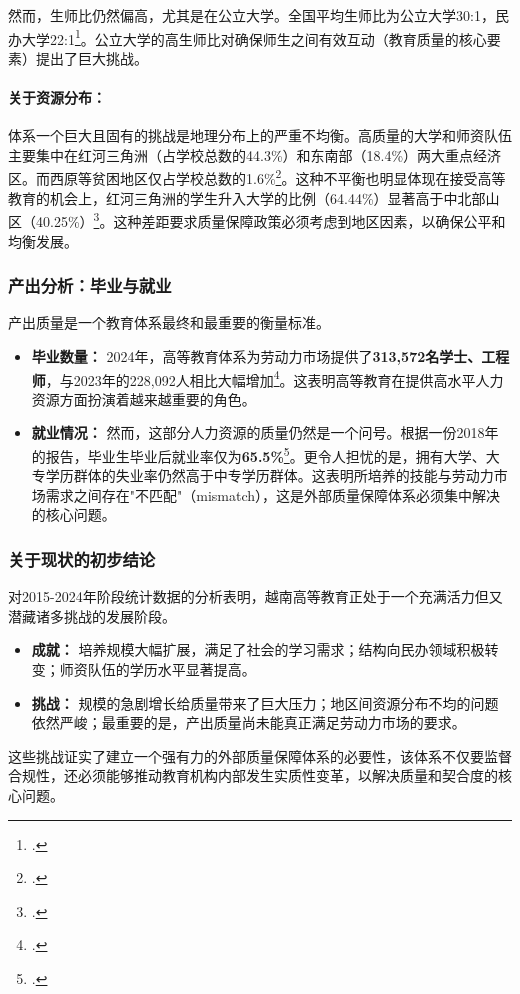 然而，生师比仍然偏高，尤其是在公立大学。全国平均生师比为公立大学30:1，民办大学22:1\footcite{stat_moet_2024}。公立大学的高生师比对确保师生之间有效互动（教育质量的核心要素）提出了巨大挑战。

\paragraph{关于资源分布：}
体系一个巨大且固有的挑战是地理分布上的严重不均衡。高质量的大学和师资队伍主要集中在红河三角洲（占学校总数的44.3\%）和东南部（18.4\%）两大重点经济区。而西原等贫困地区仅占学校总数的1.6\%\footcite{stat_quy_mo_2015_2021}。这种不平衡也明显体现在接受高等教育的机会上，红河三角洲的学生升入大学的比例（64.44\%）显著高于中北部山区（40.25\%）\footcite{stat_ty_le_vao_dh_2023}。这种差距要求质量保障政策必须考虑到地区因素，以确保公平和均衡发展。

\subsubsection{产出分析：毕业与就业}

产出质量是一个教育体系最终和最重要的衡量标准。
\begin{itemize}
    \item \textbf{毕业数量：} 2024年，高等教育体系为劳动力市场提供了\textbf{313,572名学士、工程师}，与2023年的228,092人相比大幅增加\footcite{stat_moet_2024}。这表明高等教育在提供高水平人力资源方面扮演着越来越重要的角色。
    \item \textbf{就业情况：} 然而，这部分人力资源的质量仍然是一个问号。根据一份2018年的报告，毕业生毕业后就业率仅为\textbf{65.5\%}\footcite{stat_that_nghiep_2018}。更令人担忧的是，拥有大学、大专学历群体的失业率仍然高于中专学历群体。这表明所培养的技能与劳动力市场需求之间存在"不匹配"（mismatch），这是外部质量保障体系必须集中解决的核心问题。
\end{itemize}

\subsubsection{关于现状的初步结论}
对2015-2024年阶段统计数据的分析表明，越南高等教育正处于一个充满活力但又潜藏诸多挑战的发展阶段。
\begin{itemize}
    \item \textbf{成就：} 培养规模大幅扩展，满足了社会的学习需求；结构向民办领域积极转变；师资队伍的学历水平显著提高。
    \item \textbf{挑战：} 规模的急剧增长给质量带来了巨大压力；地区间资源分布不均的问题依然严峻；最重要的是，产出质量尚未能真正满足劳动力市场的要求。
\end{itemize}
这些挑战证实了建立一个强有力的外部质量保障体系的必要性，该体系不仅要监督合规性，还必须能够推动教育机构内部发生实质性变革，以解决质量和契合度的核心问题。


